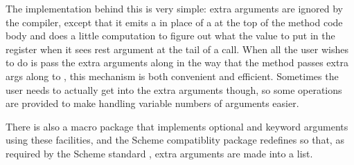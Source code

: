 The implementation behind this is very simple: extra arguments are
ignored by the compiler, except that it emits a 
in place of a  at the top of the method code body and
does a little computation to figure out what the value to put in the
 register when it sees rest argument at the tail of a call.
When all the user wishes to do is pass the extra arguments along in
the way that the  method passes extra args along to
, this mechanism is both convenient and efficient.
Sometimes the user needs to actually get into the extra arguments
though, so some operations are provided to make handling variable
numbers of arguments easier.



There is also a macro package that implements optional and keyword
arguments using these facilities, and the Scheme compatiblity package
redefines  so that, as required by the Scheme standard
\cite{R3RS}, extra arguments are made into a list.
